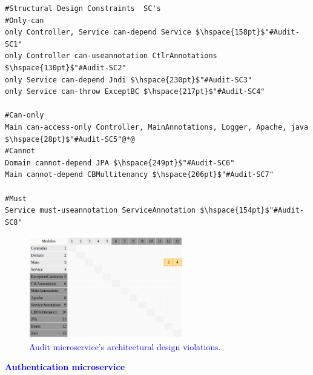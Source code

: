 \documentclass[12pt]{article}
\begin{document}
\begin{lstlisting}[style=colorido, caption={\textcolor{blue}{Audit microservice's architectural design specification.}},label={list:especArquiteturalAudit}
]
#Structural Design Constraints  SC's
#Only-can		
only Controller, Service can-depend Service	$\hspace{158pt}$"#Audit-SC1"
only Controller can-useannotation CtlrAnnotations $\hspace{130pt}$"#Audit-SC2"
only Service can-depend Jndi $\hspace{230pt}$"#Audit-SC3"
only Service can-throw ExceptBC	$\hspace{217pt}$"#Audit-SC4"

#Can-only
Main can-access-only Controller, MainAnnotations, Logger, Apache, java $\hspace{28pt}$"#Audit-SC5"@*@
#Cannot
Domain cannot-depend JPA $\hspace{249pt}$"#Audit-SC6"
Main cannot-depend CBMultitenancy $\hspace{206pt}$"#Audit-SC7"

#Must 
Service must-useannotation ServiceAnnotation $\hspace{154pt}$"#Audit-SC8"
\end{lstlisting}
\begin{figure}[ht]
\centering
\includegraphics[width=0.6\textwidth]{figuras/violacoesAudit.png}
\caption{\textcolor{blue}{Audit microservice's architectural design violations.}}
\label{fig:microservices}
\end{figure}
\newpage
\noindent\textbf{\textcolor{blue}{Authentication microservice}}
\label{sec:ApendiceAuthentication}

\end{document}
